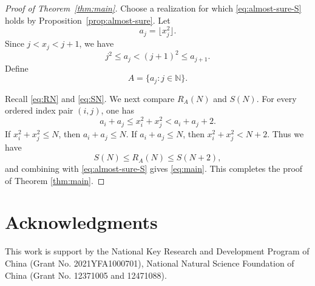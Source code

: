 \documentclass[12pt,reqno]{amsart}
\theoremstyle{plain}
\theoremstyle{definition}
\newcommand{\N}{\mathbb N}
\begin{document}
\begin{proof}[Proof of Theorem~\ref{thm:main}] 
Choose a realization for which \eqref{eq:almost-sure-S} holds by
Proposition~\ref{prop:almost-sure}. Let
\begin{equation*}
 a_j=\lfloor x_j^2\rfloor.
\end{equation*}
Since $j<x_j<j+1$, we have
$$j^2\le a_j<(j+1)^2\le a_{j+1}.$$
Define 
$$A=\{a_j: j\in \N\}.$$ 

Recall \eqref{eq:RN} and \eqref{eq:SN}. We next compare $R_A(N)$ and $S(N)$. For every ordered index pair $(i,j)$, one has
\[
 a_i+a_j\le x_i^2+x_j^2<a_i+a_j+2.
\]
If $x_i^2+x_j^2\le N$, then $a_i+a_j\le N$.
If $a_i+a_j\le N$, then $x_i^2+x_j^2<N+2$. Thus we have
\begin{equation*}
 S(N)\le R_A(N)\le S(N+2),
\end{equation*}
and combining with \eqref{eq:almost-sure-S} gives \eqref{eq:main}. This completes the proof of Theorem \ref{thm:main}.
\end{proof}

\medskip

\section*{Acknowledgments}
This work is support by the National Key Research and Development Program of China (Grant No. 2021YFA1000701), National Natural Science Foundation of China  (Grant No. 12371005 and 12471088).
\end{document}
